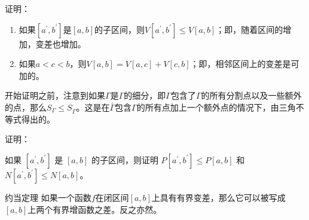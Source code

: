 \begin{example}{证明：}

\end{example}
\begin{theorem}{}
\begin{enumerate}
\item 如果$[a^{\prime},b^{\prime}]$是$[a,b]$的子区间，则$V[a^{\prime},b^{\prime}]\leq V[a,b]$；即，随着区间的增加，变差也增加。
\item 如果$a<c<b$，则$V[a,b]=V[a,c]+V[c,b]$；即，相邻区间上的变差是可加的。
\end{enumerate}
\end{theorem}
开始证明之前，注意到如果$\Gamma$是$\Gamma$的细分，即$\Gamma$包含了$\Gamma$的所有分割点以及一些额外的点，那么$S_{\Gamma}\leq S_{\bar{\Gamma}}$。这是在$\bar{\Gamma}$包含$\Gamma$的所有点加上一个额外点的情况下，由三角不等式得出的。

\begin{example}{证明：}

\end{example}

\begin{example}{如果 $[a^{\prime},b^{\prime}]$ 是 $[a,b]$ 的子区间，则证明 $P[a^{\prime},b^{\prime}]\leq P[a,b]$ 和 $N[a^{\prime},b^{\prime}]\leq N[a,b]$。}

\end{example}

\begin{corollary}{约当定理}
如果一个函数$f$在闭区间$[a,b]$上具有有界变差，那么它可以被写成$[a,b]$上两个有界增函数之差。反之亦然。
\end{corollary}

